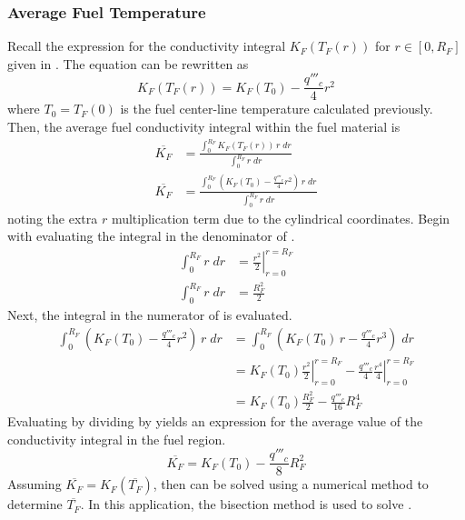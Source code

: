     \subsubsection{Average Fuel Temperature}
      Recall the expression for the conductivity integral $K_F(T_F(r))$ for $r
      \in [0,R_F]$ given in . The equation can be rewritten as
      \begin{equation}
        K_F(T_F(r)) = K_F(T_0) - \frac{q'''_c}{4} r^2
      \end{equation}
      where $T_0=T_F(0)$ is the fuel center-line temperature calculated 
      previously.
      Then, the average fuel conductivity integral within the fuel material is 
      \begin{align}
        \overline{K_F} &= \frac{\int_0^{R_F} K_F(T_F(r)) \, r \; dr}
          {\int_0^{R_F} r \; dr} \\
        \label{eq:kf_integral}
        \overline{K_F} &= \frac{\int_0^{R_F} 
          \left( K_F(T_0) - \frac{q'''_c}{4} r^2 \right)
          \, r \; dr}{\int_0^{R_F} r \; dr}
      \end{align}
      noting the extra $r$ multiplication term due to the cylindrical
      coordinates. Begin with evaluating the integral in the denominator
      of .
      \begin{align}
        \int_0^{R_F} r \; dr &= \left. \frac{r^2}{2} \right|_{r=0}^{r=R_F} \\
        \label{eq:kf_denominator}
        \int_0^{R_F} r \; dr &= \frac{R_F^2}{2}
      \end{align}
      Next, the integral in the numerator of  is evaluated.
      \begin{align}
        \int_0^{R_F} \left( K_F(T_0) - \frac{q'''_c}{4} r^2 \right) \, r \; dr&=
          \int_0^{R_F} \left( K_F(T_0) \, r - \frac{q'''_c}{4} r^3 \right) \;
          dr\\
        &= \left. K_F(T_0) \frac{r^2}{2} \right|_{r=0}^{r=R_F} -
          \left. \frac{q'''_c}{4} \frac{r^4}{4} \right|_{r=0}^{r=R_F} \\
        \label{eq:kf_numerator}
        &= K_F(T_0) \frac{R_F^2}{2} - \frac{q'''_c}{16} R_F^4
      \end{align}
      Evaluating  by dividing  by
       yields an expression for the average value of the
      conductivity integral in the fuel region.
      \begin{equation}
        \label{eq:kf_bar}
        \overline{K_F} = K_F(T_0) - \frac{q'''_c}{8} R_F^2
      \end{equation}
      Assuming $\overline{K_F} = K_F(\overline{T_F})$, then  can
      be solved using a numerical method to determine $\overline{T_F}$. In this
      application, the bisection method is used to solve .

